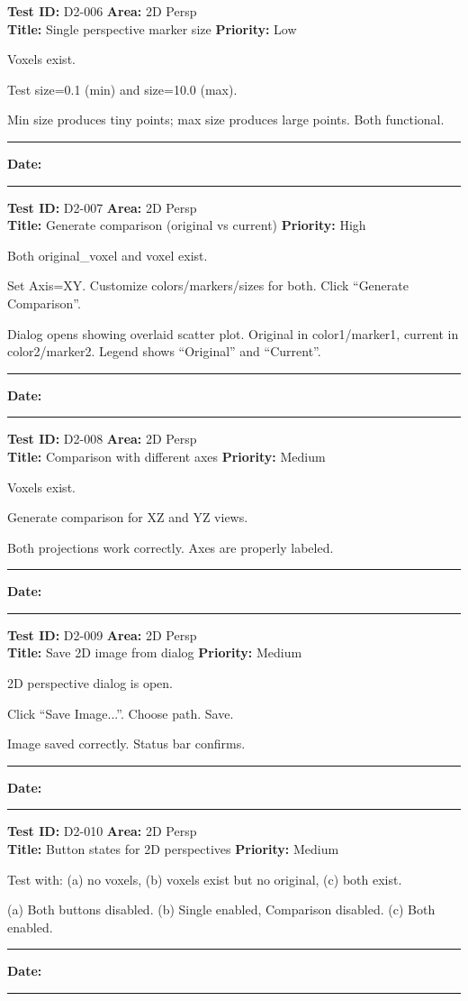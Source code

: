 \documentclass[12pt,a4paper]{article}
\newenvironment{testcase}[4]{%
  \smallskip
  \noindent\textbf{Test ID:} #1 \hfill \textbf{Area:} #2 \\
  \textbf{Title:} #3 \hfill \textbf{Priority:} #4
  \begin{description}[leftmargin=2em,style=nextline]
    \item[\textbf{Preconditions:}]
}{%
    \item[\textbf{Steps:}]
    \item[\textbf{Expected Result:}]
    \item[\textbf{Status:}] \rule{3cm}{0.4pt} \hspace{1em} \textbf{Date:} \rule{3cm}{0.4pt}
    \item[\textbf{Notes:}]
  \end{description}
  \smallskip
}
\begin{document}
\begin{testcase}{D2-006}{2D Persp}{Single perspective marker size}{Low}
  \item Voxels exist.
  \item Test size=0.1 (min) and size=10.0 (max).
  \item Min size produces tiny points; max size produces large points. Both functional.
\end{testcase}

\begin{testcase}{D2-007}{2D Persp}{Generate comparison (original vs current)}{High}
  \item Both original\_voxel and voxel exist.
  \item Set Axis=XY. Customize colors/markers/sizes for both. Click ``Generate Comparison''.
  \item Dialog opens showing overlaid scatter plot. Original in color1/marker1, current in color2/marker2. Legend shows ``Original'' and ``Current''.
\end{testcase}

\begin{testcase}{D2-008}{2D Persp}{Comparison with different axes}{Medium}
  \item Voxels exist.
  \item Generate comparison for XZ and YZ views.
  \item Both projections work correctly. Axes are properly labeled.
\end{testcase}

\begin{testcase}{D2-009}{2D Persp}{Save 2D image from dialog}{Medium}
  \item 2D perspective dialog is open.
  \item Click ``Save Image...''. Choose path. Save.
  \item Image saved correctly. Status bar confirms.
\end{testcase}

\begin{testcase}{D2-010}{2D Persp}{Button states for 2D perspectives}{Medium}
  \item Test with: (a) no voxels, (b) voxels exist but no original, (c) both exist.
  \item (a) Both buttons disabled. (b) Single enabled, Comparison disabled. (c) Both enabled.
\end{testcase}

\end{document}
